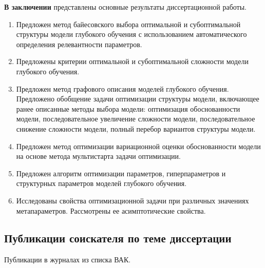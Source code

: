 \documentclass[11pt, a5paper]{dissert}
\theoremstyle{definition}
\begin{document}
{\vspace{0.5cm}
\textbf{В заключении} представлены основные результаты диссертационной работы.

\begin{enumerate}
\item Предложен метод байесовского выбора оптимальной и субоптимальной структуры модели глубокого обучения с использованием автоматического определения релевантности параметров.
\item Предложены критерии оптимальной и субоптимальной сложности модели глубокого обучения.
\item Предложен метод графового описания моделей глубокого обучения.
Предложено обобщение задачи оптимизации структуры модели, включающее ранее описанные методы выбора модели: оптимизация обоснованности модели, последовательное увеличение сложности модели, последовательное снижение сложности модели, полный перебор вариантов структуры модели.
\item Предложен метод оптимизации вариационной оценки обоснованности модели на основе метода мультистарта задачи оптимизации.
\item Предложен алгоритм оптимизации параметров, гиперпараметров и структурных параметров моделей глубокого обучения.
\item Исследованы свойства оптимизационной задачи при различных значениях метапараметров. Рассмотрены ее асимптотические свойства.

\end{enumerate}

\subsection*{Публикации соискателя по теме диссертации}
Публикации в журналах из списка ВАК.
\vspace{0.3cm}

}
\end{document}
